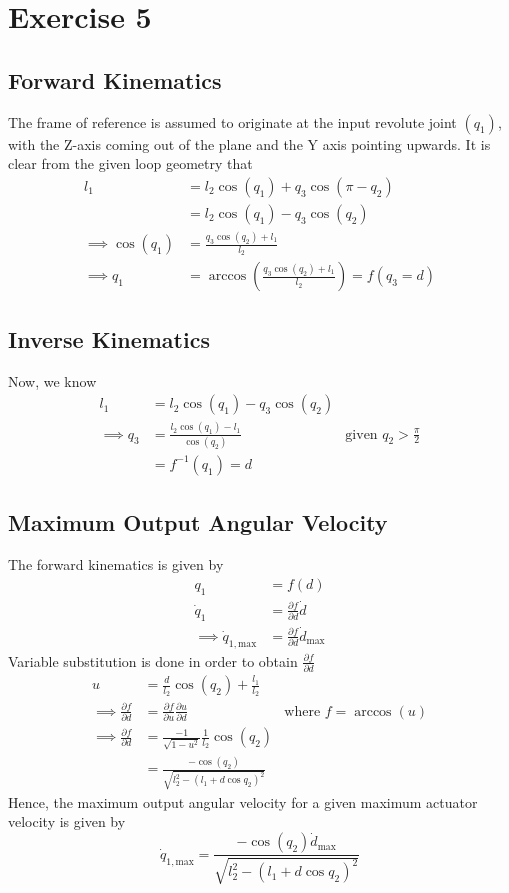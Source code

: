 \section{Exercise 5}
\subsection{Forward Kinematics}
The frame of reference is assumed to originate at the input revolute joint $\left(q_1\right)$, with the Z-axis coming out of the plane and the Y axis pointing upwards.
It is clear from the given loop geometry that
\begin{align*}
	l_1 &= l_2\cos\left(q_1\right) + q_3\cos\left(\pi - q_2\right) \\
	&= l_2\cos\left(q_1\right) - q_3\cos\left(q_2\right) \\
	\implies\cos\left(q_1\right) &= \frac{q_3\cos\left(q_2\right) + l_1}{l_2} \\
	\implies q_1 &= \arccos\left(\frac{q_3\cos\left(q_2\right) + l_1}{l_2}\right) = f\left(q_3 = d\right)
\end{align*}
\subsection{Inverse Kinematics}
Now, we know
\begin{align*}
	l_1 &= l_2\cos\left(q_1\right) - q_3\cos\left(q_2\right) \\
	\implies q_3 &= \frac{l_2\cos\left(q_1\right) - l_1}{\cos\left(q_2\right)} & \text{given } q_2 > \frac{\pi}{2} \\
	&= f^{-1}\left(q_1\right) = d
\end{align*}
\subsection{Maximum Output Angular Velocity}
The forward kinematics is given by
\begin{align*}
	q_1 &= f\left(d\right) \\
	\dot{q}_1 &= \frac{\partial f}{\partial d}\dot{d}\\
	\implies \dot{q}_{1,\text{max}} &=  \frac{\partial f}{\partial d}\dot{d}_{\text{max}}
\end{align*}
Variable substitution is done in order to obtain $\frac{\partial f}{\partial d}$
\begin{align*}
	u &= \frac{d}{l_2}\cos\left(q_2\right) + \frac{l_1}{l_2}  \\
	\implies \frac{\partial f}{\partial d} &= \frac{\partial f}{\partial u}\frac{\partial u}{\partial d} &\text{where } f = \arccos\left(u\right)\\
	\implies \frac{\partial f}{\partial d} &= \frac{-1}{\sqrt{1-u^2}}\frac{1}{l_2}\cos\left(q_2\right)\\
	&= \frac{-\cos\left(q_2\right)}{\sqrt{l_2^2 - \left(l_1 + d\cos q_2\right)^2}}
\end{align*}
Hence, the maximum output angular velocity for a given maximum actuator velocity is given by
\begin{equation*}
	\dot{q}_{1,\text{max}} = \frac{-\cos\left(q_2\right)\dot{d}_{\text{max}}}{\sqrt{l_2^2 - \left(l_1 + d\cos q_2\right)^2}}
\end{equation*}
